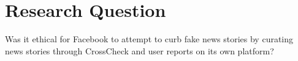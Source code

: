 
\section{Research Question}

Was it ethical for Facebook to attempt to curb fake news stories by curating news stories through CrossCheck and user reports on its own platform?
